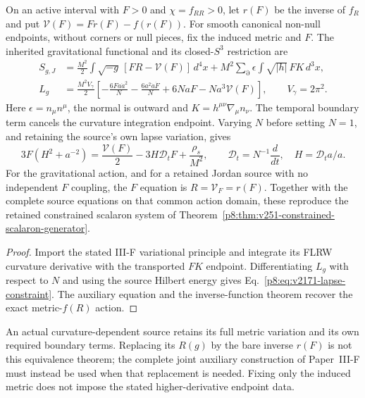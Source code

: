 \documentclass[12pt,a4paper]{article}
\begin{document}
\begin{corollary}
\label{p8:cor:v2171-inherited-variational-closure}
On an active interval with $F>0$ and $\chi=f_{RR}>0$, let $r(F)$ be the
inverse of $f_R$ and put $\mathcal V(F)=Fr(F)-f(r(F))$. For smooth canonical
non-null endpoints, without corners or null pieces, fix the induced metric
and $F$. The inherited
gravitational functional and its closed-$S^3$ restriction are
\begin{align}
 S_{g,J}&=\frac{M^2}{2}\int\sqrt{-g}\,[FR-\mathcal V(F)]\,d^4x
 +M^2\sum_{\partial}\epsilon\int\sqrt{|h|}\,FK\,d^3x,
 \label{p8:eq:v2171-boundary-complete-gravity}\\
 L_g&=\frac{M^2V_\gamma}{2}\left[
 -\frac{6Fa\dot a^2}{N}-\frac{6a^2\dot a\dot F}{N}
 +6NaF-Na^3\mathcal V(F)\right],\qquad V_\gamma=2\pi^2.
 \label{p8:eq:v2171-lapse-retained-action}
\end{align}
Here $\epsilon=n_\mu n^\mu$, the normal is outward and
$K=h^{\mu\nu}\nabla_\mu n_\nu$. The temporal boundary term cancels the
curvature integration endpoint. Varying $N$ before setting $N=1$, and
retaining the source's own lapse variation, gives
\begin{equation}
 \boxed{3F(H^2+a^{-2})=\frac{\mathcal V(F)}2
 -3H\mathcal D_tF+\frac{\rho_s}{M^2},\qquad
 \mathcal D_t=N^{-1}\frac{d}{dt},\quad H=\mathcal D_ta/a.}
 \label{p8:eq:v2171-lapse-constraint}
\end{equation}
For the gravitational action, and for a retained Jordan source with no
independent $F$ coupling, the $F$ equation is $R=\mathcal V_F=r(F)$.
Together with the complete source equations on that common action domain,
these reproduce the retained constrained scalaron system of
Theorem~\ref{p8:thm:v251-constrained-scalaron-generator}.
\end{corollary}
\begin{proof}
Import the stated III-F variational principle and integrate its FLRW
curvature derivative with the transported $FK$ endpoint. Differentiating
$L_g$ with respect to $N$ and using the source Hilbert energy gives
Eq.~\eqref{p8:eq:v2171-lapse-constraint}. The auxiliary equation and the
inverse-function theorem recover the exact metric-$f(R)$ action.
\end{proof}
An actual curvature-dependent source retains its full metric variation and
its own required boundary terms. Replacing its $R(g)$ by the bare inverse
$r(F)$ is not this equivalence theorem; the complete joint auxiliary
construction of Paper~III-F must instead be used when that replacement is
needed. Fixing only the induced metric does not impose the stated
higher-derivative endpoint data.
\end{document}
